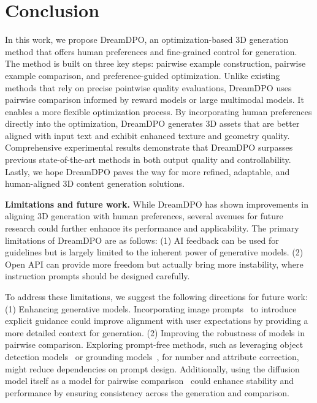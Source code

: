 \section{Conclusion}
\label{sec:clu}

In this work, we propose DreamDPO, an optimization-based 3D generation method that offers human preferences and fine-grained control for generation.
The method is built on three key steps: pairwise example construction, pairwise example comparison, and preference-guided optimization.
Unlike existing methods that rely on precise pointwise quality evaluations, DreamDPO uses pairwise comparison informed by reward models or large multimodal models. It enables a more flexible optimization process.
By incorporating human preferences directly into the optimization, DreamDPO generates 3D assets that are better aligned with input text and exhibit enhanced texture and geometry quality.
Comprehensive experimental results demonstrate that DreamDPO surpasses previous state-of-the-art methods in both output quality and controllability. Lastly, we hope DreamDPO paves the way for more refined, adaptable, and human-aligned 3D content generation solutions.


\textbf{Limitations and future work.}
While DreamDPO has shown improvements in aligning 3D generation with human preferences, several avenues for future research could further enhance its performance and applicability.
The primary limitations of DreamDPO are as follows:
(1) AI feedback can be used for guidelines but is largely limited to the inherent power of generative models. 
(2) Open API can provide more freedom but actually bring more instability, where instruction prompts should be designed carefully. 

To address these limitations, we suggest the following directions for future work:
(1) Enhancing generative models.
Incorporating image prompts~\citep{chen2024vp3d} to introduce explicit guidance could improve alignment with user expectations by providing a more detailed context for generation. (2) Improving the robustness of models in pairwise comparison.
Exploring prompt-free methods, such as leveraging object detection models~\citep{wang2023detecting} or grounding models~\citep{oquab2023dinov2}, for number and attribute correction, might reduce dependencies on prompt design. 
Additionally, using the diffusion model itself as a model for pairwise comparison~\citep{tian2024diffuse} could enhance stability and performance by ensuring consistency across the generation and comparison.